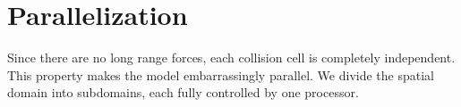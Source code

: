 \section{Parallelization}
Since there are no long range forces, each collision cell is completely independent. This property makes the model embarrassingly parallel. We divide the spatial domain into subdomains, each fully controlled by one processor. 
\subsection{}